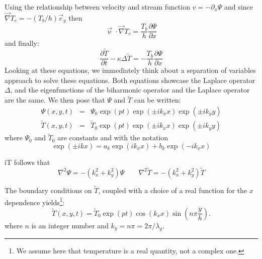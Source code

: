 Using the relationship between velocity and stream function
$v=-\partial_x \Psi$
and since $\vec\nabla T_c = - (T_b/h) \vec{e}_y$ then
\[
{\vec \upnu}\cdot {\vec \nabla} T_c =  \frac{T_b}{h}   \frac{\partial \Psi}{\partial x} 
\]
and finally:
\begin{equation}
\boxed{
\frac{\partial \tilde{T}}{\partial t} - \kappa \Delta \tilde{T} 
= -  \frac{T_b}{h}   \frac{\partial \Psi}{\partial x}
}
\end{equation}
Looking at these equations, we immediately think about a separation of variables approach to solve these
equations. Both equations showcase the Laplace operator $\Delta$, and the eigenfunctions of the biharmonic operator and the Laplace operator are the same. 
We then pose that $\Psi$ and $\tilde{T}$ can be written:
\begin{eqnarray}
\Psi(x,y,t) &=& \Psi_0 \exp(pt)\exp(\pm i k_x x) \exp(\pm i k_y y) \\ %
\tilde{T}(x,y,t) &=& \tilde{T}_0 \exp(pt) \exp(\pm i k_x x) \exp(\pm i k_y y) %
\end{eqnarray}
where $\Psi_0$ and $\tilde{T}_0$ are constants and with the notation
\[
\exp (\pm i k x) = a_k \exp (i k_x x) + b_k \exp (-i k_x x )
\]

iT follows that
\[
\nabla^2 \Psi = -(k_x^2+k_y^2) \Psi
\quad\quad
\nabla^2 \tilde{T} = -(k_x^2+k_y^2) \tilde{T}
\]

The boundary conditions on $\tilde{T}$, 
coupled with a choice of a real function for the $x$ dependence 
yields\footnote{We assume here that temperature is a real quantity, not a complex one.}:
\[
\tilde{T}(x,y,t) = \tilde{T}_0 \exp(pt) \cos (k_x x) \sin \left(n\pi \frac{y}{h} \right).
\]
where $n$ is an integer number and $k_y=n \pi = 2 \pi/ \lambda_y$. 

